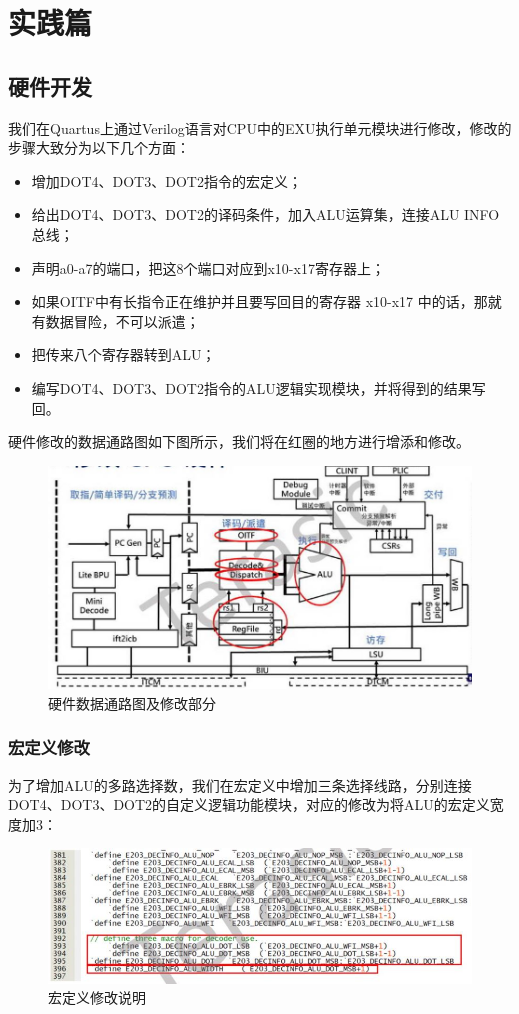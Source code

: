 \documentclass[a4paper, 14pt, oneside]{book} %
\numberwithin{equation}{subsection}
\begin{document}
		
	\section{实践篇}
	\subsection{硬件开发}
	我们在Quartus上通过Verilog语言对CPU中的EXU执行单元模块进行修改，修改的步骤大致分为以下几个方面：
	\begin{itemize}
		\item 增加DOT4、DOT3、DOT2指令的宏定义；
		\item 给出DOT4、DOT3、DOT2的译码条件，加入ALU运算集，连接ALU INFO总线；
		\item 声明a0-a7的端口，把这8个端口对应到x10-x17寄存器上；
		\item 如果OITF中有长指令正在维护并且要写回目的寄存器 x10-x17 中的话，那就有数据冒险，不可以派遣；
		\item 把传来八个寄存器转到ALU；
		\item 编写DOT4、DOT3、DOT2指令的ALU逻辑实现模块，并将得到的结果写回。
	\end{itemize}
	硬件修改的数据通路图如下图所示，我们将在红圈的地方进行增添和修改。
	\begin{figure}[H]
		\centering
		\includegraphics[scale=0.8]{img/datalink.jpg}
		\caption{硬件数据通路图及修改部分}
	\end{figure}
	\subsubsection{宏定义修改}
	为了增加ALU的多路选择数，我们在宏定义中增加三条选择线路，分别连接DOT4、DOT3、DOT2的自定义逻辑功能模块，对应的修改为将ALU的宏定义宽度加3：
	\begin{figure}[H]
		\centering
		\includegraphics[scale=1]{img/define.jpg}
		\caption{宏定义修改说明}
	\end{figure}
	
\end{document}
